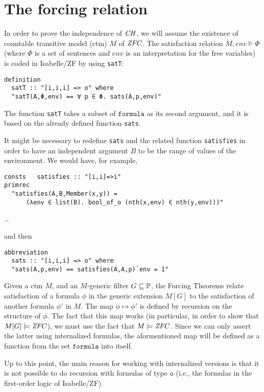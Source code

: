 \documentclass[11pt,english]{article}
\renewcommand{\PP}{\mathbb{P}}
\newcommand{\formula}{\ensuremath{\mathtt{formula}}}
\newcommand{\tyo}{\mathtt{o}}
\begin{document}
\section{The forcing relation}
In order to prove the independence of $\mathit{CH}$, we will assume the
existence of countable transitive model (ctm) $M$ of $\mathit{ZFC}$. The
satisfaction relation $M,\mathit{env}\models\Phi$ (where $\Phi$ is a set of
sentences and $\mathit{env}$ is an interpretation for the free
variables) is coded in Isabelle/ZF by using \verb|satT|:
\begin{verbatim}
definition
  satT :: "[i,i,i] => o" where
  "satT(A,Φ,env) == ∀ p ∈ Φ. sats(A,p,env)"
\end{verbatim}
The function \verb|satT| takes a subset of \formula{} as its second
argument, and it is based on the already defined function \verb|sats|.

\begin{framed}
  It might be necessary to redefine \verb|sats| and the related
  function \verb|satisfies| in order to have an independent argument $B$
  to be the range of values of the environment. We would have, for
  example, 
\begin{verbatim}
consts   satisfies :: "[i,i]=>i"
primrec 
  "satisfies(A,B,Member(x,y)) =
      (λenv ∈ list(B). bool_of_o (nth(x,env) ∈ nth(y,env)))"
\end{verbatim}
  \dots
  
\noindent and then
\begin{verbatim}
abbreviation
  sats :: "[i,i,i] => o" where
  "sats(A,p,env) == satisfies(A,A,p)`env = 1"
\end{verbatim}
\end{framed}

Given a ctm $M$, and an $M$-generic filter $G\sbq\PP$, the Forcing
Theorems relate satisfaction of a formula 
$\phi$ in the generic extension $M[G]$ to the satisfaction of another formula
$\phi'$ in $M$. The map $\phi\mapsto\phi'$ is defined by recursion on
the structure of $\phi$. The fact that this map works (in particular,
in order to show that $M[G]\models\mathit{ZFC}$), we must use the fact that
$M\models\mathit{ZFC}$. Since we can only assert the latter using internalized
formulas, the aformentioned map will be defined as a function from the
set \formula{} into itself. 

Up to this point, the main reason for working with internalized
versions is that  it is not possible to do recursion with formulas of
type $\tyo$ (i.e., the formulas in the first-order logic of
Isabelle/ZF).
\end{document}
